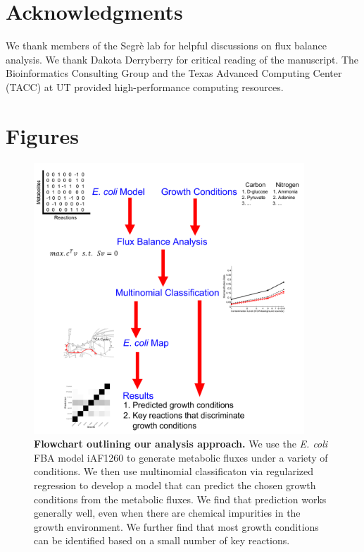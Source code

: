 \documentclass[12pt]{article}
\begin{document}
\section{Acknowledgments}
We thank members of the Segr\`e lab for helpful discussions on flux balance analysis. We thank Dakota Derryberry for critical reading of the manuscript. The Bioinformatics Consulting Group and the Texas Advanced Computing Center (TACC) at UT provided high-performance computing resources. 




\newpage

\section*{Figures}

\begin{figure}[!ht]
\centerline{\includegraphics[width=4in]{Figures/flowchart_new.pdf}}
\caption{\label{fig:flowchart}\textbf{Flowchart outlining our analysis approach.} We use the \emph{E. coli} FBA model iAF1260 to generate metabolic fluxes under a variety of conditions. We then use multinomial classificaton via regularized regression to develop a model that can predict the chosen growth conditions from the metabolic fluxes. We find that prediction works generally well, even when there are chemical impurities in the growth environment. We further find that most growth conditions can be identified based on a small number of key reactions.
}
\end{figure}
\end{document}

